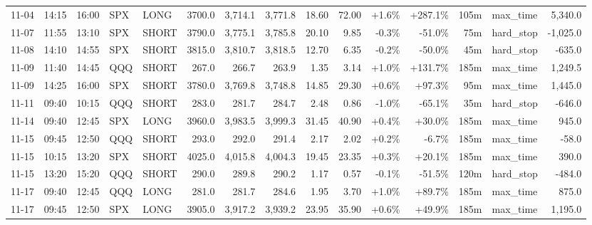 \documentclass[11pt,a4paper,twoside]{article}
\begin{document}
\begin{landscape}
\begin{center}
\begin{longtable}{>{\color{txtmain}}l l l l l r r r r r r r r >{\color{txtmain}}l r}
11-04 & 14:15 & 16:00 & SPX & LONG & 3700.0 & 3,714.1 & 3,771.8 & 18.60 & 72.00 & \textcolor{wingreen}{+1.6\%} & \textcolor{wingreen}{+287.1\%} & 105m & max\_time & \textcolor{wingreen}{5,340.0} \\
11-07 & 11:55 & 13:10 & SPX & SHORT & 3790.0 & 3,775.1 & 3,785.8 & 20.10 & 9.85 & \textcolor{lossred}{-0.3\%} & \textcolor{lossred}{-51.0\%} & 75m & hard\_stop & \textcolor{lossred}{-1,025.0} \\
11-08 & 14:10 & 14:55 & SPX & SHORT & 3815.0 & 3,810.7 & 3,818.5 & 12.70 & 6.35 & \textcolor{lossred}{-0.2\%} & \textcolor{lossred}{-50.0\%} & 45m & hard\_stop & \textcolor{lossred}{-635.0} \\
11-09 & 11:40 & 14:45 & QQQ & SHORT & 267.0 & 266.7 & 263.9 & 1.35 & 3.14 & \textcolor{wingreen}{+1.0\%} & \textcolor{wingreen}{+131.7\%} & 185m & max\_time & \textcolor{wingreen}{1,249.5} \\
11-09 & 14:25 & 16:00 & SPX & SHORT & 3780.0 & 3,769.8 & 3,748.8 & 14.85 & 29.30 & \textcolor{wingreen}{+0.6\%} & \textcolor{wingreen}{+97.3\%} & 95m & max\_time & \textcolor{wingreen}{1,445.0} \\
11-11 & 09:40 & 10:15 & QQQ & SHORT & 283.0 & 281.7 & 284.7 & 2.48 & 0.86 & \textcolor{lossred}{-1.0\%} & \textcolor{lossred}{-65.1\%} & 35m & hard\_stop & \textcolor{lossred}{-646.0} \\
11-14 & 09:40 & 12:45 & SPX & LONG & 3960.0 & 3,983.5 & 3,999.3 & 31.45 & 40.90 & \textcolor{wingreen}{+0.4\%} & \textcolor{wingreen}{+30.0\%} & 185m & max\_time & \textcolor{wingreen}{945.0} \\
11-15 & 09:45 & 12:50 & QQQ & SHORT & 293.0 & 292.0 & 291.4 & 2.17 & 2.02 & \textcolor{wingreen}{+0.2\%} & \textcolor{lossred}{-6.7\%} & 185m & max\_time & \textcolor{lossred}{-58.0} \\
11-15 & 10:15 & 13:20 & SPX & SHORT & 4025.0 & 4,015.8 & 4,004.3 & 19.45 & 23.35 & \textcolor{wingreen}{+0.3\%} & \textcolor{wingreen}{+20.1\%} & 185m & max\_time & \textcolor{wingreen}{390.0} \\
11-15 & 13:20 & 15:20 & QQQ & SHORT & 290.0 & 289.8 & 290.2 & 1.17 & 0.57 & \textcolor{lossred}{-0.1\%} & \textcolor{lossred}{-51.5\%} & 120m & hard\_stop & \textcolor{lossred}{-484.0} \\
11-17 & 09:40 & 12:45 & QQQ & LONG & 281.0 & 281.7 & 284.6 & 1.95 & 3.70 & \textcolor{wingreen}{+1.0\%} & \textcolor{wingreen}{+89.7\%} & 185m & max\_time & \textcolor{wingreen}{875.0} \\
11-17 & 09:45 & 12:50 & SPX & LONG & 3905.0 & 3,917.2 & 3,939.2 & 23.95 & 35.90 & \textcolor{wingreen}{+0.6\%} & \textcolor{wingreen}{+49.9\%} & 185m & max\_time & \textcolor{wingreen}{1,195.0} \\

\end{longtable}
\end{center}
\end{landscape}
\end{document}
